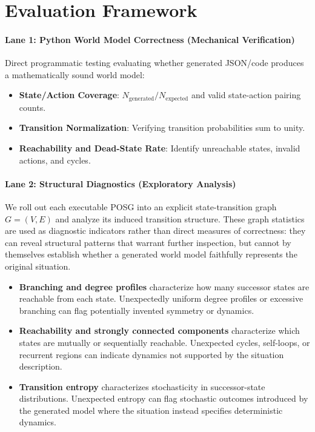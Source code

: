 \documentclass{article}
\begin{document}
\section{Evaluation Framework}
\label{subsec:evaluation_framework}

\paragraph{Lane 1: Python World Model Correctness (Mechanical Verification)}
Direct programmatic testing evaluating whether generated JSON/code produces a mathematically sound world model:
\begin{itemize}
    \item \textbf{State/Action Coverage}: $N_{\text{generated}} / N_{\text{expected}}$ and valid state-action pairing counts.
    \item \textbf{Transition Normalization}: Verifying transition probabilities sum to unity.
    \item \textbf{Reachability and Dead-State Rate}: Identify unreachable states, invalid actions, and cycles.
\end{itemize}

\paragraph{Lane 2: Structural Diagnostics (Exploratory Analysis)}
We roll out each executable POSG into an explicit state-transition graph $G=(V,E)$ and analyze its induced transition structure. These graph statistics are used as diagnostic indicators rather than direct measures of correctness: they can reveal structural patterns that warrant further inspection, but cannot by themselves establish whether a generated world model faithfully represents the original situation.

\begin{itemize}
    \item \textbf{Branching and degree profiles} characterize how many successor states are reachable from each state. Unexpectedly uniform degree profiles or excessive branching can flag potentially invented symmetry or dynamics.

    \item \textbf{Reachability and strongly connected components} characterize which states are mutually or sequentially reachable. Unexpected cycles, self-loops, or recurrent regions can indicate dynamics not supported by the situation description.

    \item \textbf{Transition entropy} characterizes stochasticity in successor-state distributions. Unexpected entropy can flag stochastic outcomes introduced by the generated model where the situation instead specifies deterministic dynamics.
\end{itemize}
\end{document}
